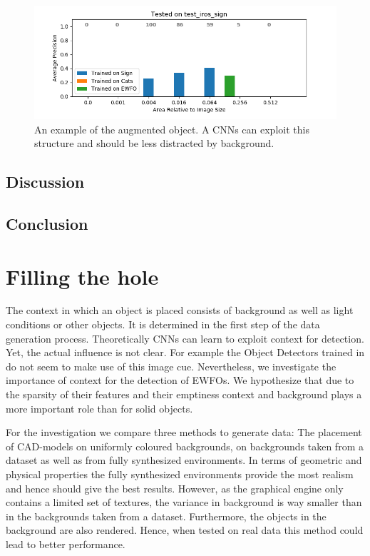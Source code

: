 \begin{figure}
	\includegraphics[width=\textwidth]{fig/basement_cats_size}
	\caption{An example of the augmented object. A \acp{CNN} can exploit this structure and should be less distracted by background.}
	\label{fig:basement_cats}
\end{figure}

\subsection{Discussion}

\subsection{Conclusion}

\section{Filling the hole}

The context in which an object is placed consists of background as well as light conditions or other objects. It is determined in the first step of the data generation process. Theoretically \acp{CNN} can learn to exploit context for detection. Yet, the actual influence is not clear. For example the Object Detectors trained in \cite{Peng} do not seem to make use of this image cue. Nevertheless, we investigate the importance of context for the detection of \acp{EWFO}. We hypothesize that due to the sparsity of their features and their emptiness context and background plays a more important role than for solid objects.

For the investigation we compare three methods to generate data: The placement of \ac{CAD}-models on uniformly coloured backgrounds, on backgrounds taken from a dataset as well as from fully synthesized environments. In terms of geometric and physical properties the fully synthesized environments provide the most realism and hence should give the best results. However, as the graphical engine only contains a limited set of textures, the variance in background is way smaller than in the backgrounds taken from a dataset. Furthermore, the objects in the background are also rendered. Hence, when tested on real data this method could lead to better performance.


